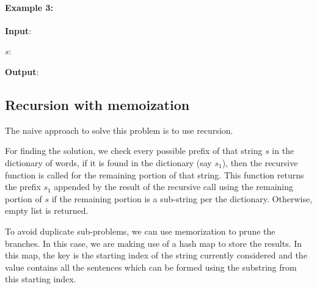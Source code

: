 \paragraph{Example 3:}
\begin{flushleft}
\textbf{Input}: 

$s$: 



\textbf{Output}: \fcj{[]}
\end{flushleft}


\subsection{Recursion with memoization}
The naive approach to solve this problem is to use recursion. 

For finding the solution, we check every possible prefix of that string $s$ in the dictionary of words, if it is found in the dictionary (say $s_1$), then the recursive function is called for the remaining portion of that string. This function returns the prefix $s_1$ appended by the result of the recursive call using the remaining portion of $s$ if the remaining portion is a sub-string per the dictionary. Otherwise, empty list is returned.

To avoid duplicate sub-problems, we can use memorization to prune the branches. In this case, we are making use of a hash map to store the results. In this map, the key is the starting index of the string currently considered and the value contains all the sentences which can be formed using the substring from this starting index. 

